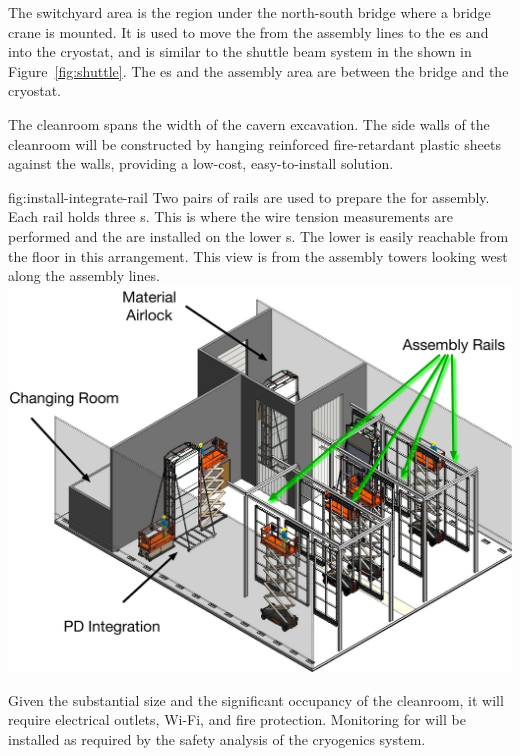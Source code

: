 The switchyard area is the region under the north-south bridge where a bridge crane is mounted. It is used to move the  from the assembly lines to the \coldbox{}es and into the cryostat, and is similar to the shuttle beam system in the  shown in Figure~\ref{fig:shuttle}. The \coldbox{}es and the  assembly area are between the bridge and the cryostat.


The cleanroom spans the width of the cavern excavation. The side walls of the cleanroom will be constructed by hanging reinforced fire-retardant plastic sheets against the walls, providing a low-cost, easy-to-install solution. 


\begin{dunefigure}{fig:install-integrate-rail}
  {Two pairs of rails are used to prepare the  for assembly. Each rail holds three s. This is where the wire tension measurements are performed and the   are installed on the lower s. The lower  is easily reachable from the floor in this arrangement. This view is from the assembly towers looking west along the assembly lines.}
\includegraphics[width=.8\textwidth]{graphics/install-integrate-rail.pdf}
\end{dunefigure}


Given the substantial size and the significant occupancy of the cleanroom, it will require electrical outlets, Wi-Fi, and fire protection. Monitoring for  will be installed as required by the safety analysis of the \coldbox cryogenics system.

